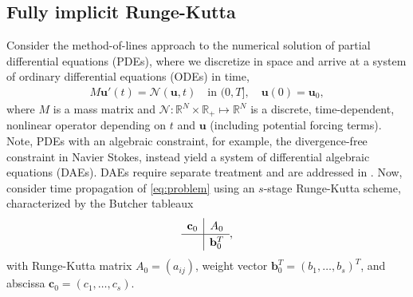 \documentclass[review]{siamart}
\begin{document}
\subsection{Fully implicit Runge-Kutta}\label{sec:intro:irk}

Consider the method-of-lines approach to the numerical solution of partial differential
equations (PDEs), where we discretize in space and arrive at a system of ordinary
differential equations (ODEs) in time,
%
\begin{align}\label{eq:problem}
	M\mathbf{u}'(t) =  \mathcal{N}(\mathbf{u},t) \quad\text{in }(0,T], \quad \mathbf{u}(0) = \mathbf{u}_0,
\end{align}
%
where $M$ is a mass matrix and $\mathcal{N}:\mathbb{R}^{N} \times \mathbb{R}_+
\mapsto\mathbb{R}^{N}$ is a discrete, time-dependent, nonlinear operator
depending on $t$ and $\mathbf{u}$ (including potential forcing terms). Note,
PDEs with an algebraic constraint, for example, the divergence-free constraint
in Navier Stokes, instead yield a system of differential algebraic equations
(DAEs). DAEs require separate treatment and are addressed in .
Now, consider time propagation of \eqref{eq:problem} using an $s$-stage
Runge-Kutta scheme, characterized by the Butcher tableaux
%
\begin{align*}
	\renewcommand\arraystretch{1.2}
	\begin{array}
	{c|c}
	\mathbf{c}_0 & A_0\\
	\hline
	& \mathbf{b}_0^T
	\end{array},
\end{align*}
%
with Runge-Kutta matrix $A_0 = (a_{ij})$, weight vector $\mathbf{b}_0^T = (b_1, \ldots, b_s)^T$,
and abscissa $\mathbf{c}_0 = (c_1, \ldots, c_s)$.
\end{document}
